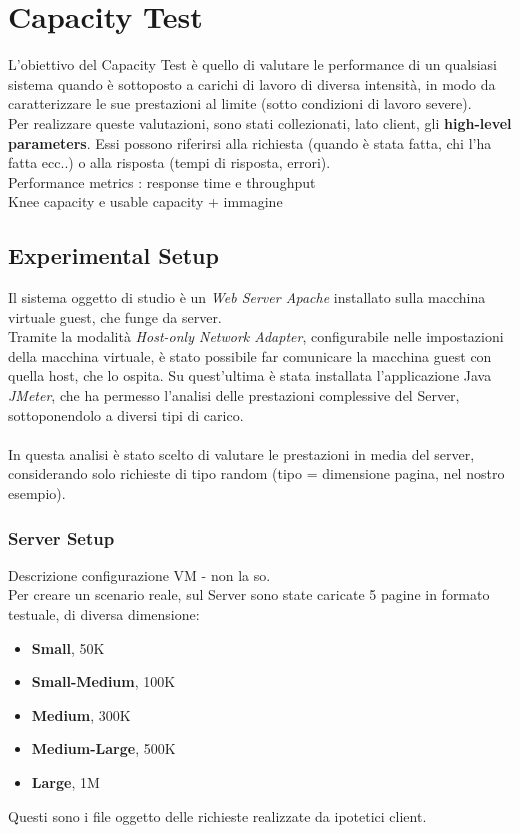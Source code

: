 \chapter{Capacity Test}
L'obiettivo del Capacity Test è quello di valutare le performance di un qualsiasi sistema quando è sottoposto a carichi di lavoro di diversa intensità, in modo da caratterizzare le sue prestazioni al limite (sotto condizioni di lavoro severe).
\\
Per realizzare queste valutazioni, sono stati collezionati, lato client, gli \textbf{high-level parameters}. Essi possono riferirsi alla richiesta (quando è stata fatta, chi l'ha fatta ecc..) o alla risposta (tempi di risposta, errori).
\\
Performance metrics : response time e throughput
\\
Knee capacity e usable capacity + immagine

\section{Experimental Setup}
Il sistema oggetto di studio è un \textit{Web Server Apache} installato sulla macchina virtuale guest, che funge da server.
\\
Tramite la modalità \textit{Host-only Network Adapter}, configurabile nelle impostazioni della macchina virtuale, è stato possibile far comunicare la macchina guest con quella host, che lo ospita. Su quest'ultima è stata installata l'applicazione Java \textit{JMeter}, che ha permesso l'analisi delle prestazioni complessive del Server, sottoponendolo a diversi tipi di carico.
\\
\\
In questa analisi è stato scelto di valutare le prestazioni in media del server, considerando solo richieste di tipo random (tipo = dimensione pagina, nel nostro esempio). 
\subsection{Server Setup}
Descrizione configurazione VM - non la so.
\\
Per creare un scenario reale, sul Server sono state caricate 5 pagine in formato testuale, di diversa dimensione:
\begin{itemize}
	\item \textbf{Small}, 50K
	\item \textbf{Small-Medium}, 100K
	\item \textbf{Medium}, 300K
	\item \textbf{Medium-Large}, 500K
	\item \textbf{Large}, 1M
\end{itemize}
Questi sono i file oggetto delle richieste realizzate da ipotetici client.
